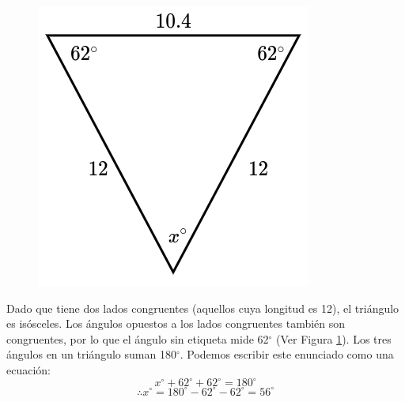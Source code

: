 \begin{minipage}[t][][t]{0.6\textwidth}
    \begin{solutionbox}{8cm}
        \begin{minipage}{0.3\textwidth}
            \begin{figure}[H]
                \centering
                \includegraphics[width=0.9\linewidth]{../images/findangle02a.png}
                \caption{}
                \label{fig:findangle02a}
            \end{figure}
        \end{minipage}\hfill
        \begin{minipage}{0.65\textwidth}
            Dado que tiene dos lados congruentes (aquellos cuya longitud es 12), el triángulo es isósceles. Los ángulos opuestos a los lados congruentes también son congruentes, por lo que el ángulo sin etiqueta mide 62$^\circ$ (Ver Figura \ref{fig:findangle02a}).
            Los tres ángulos en un triángulo suman 180$^\circ$. Podemos escribir este enunciado como una ecuación:
            \[x^\circ + 62^\circ + 62^\circ = 180^\circ \]
            \[\therefore x^\circ = 180^\circ - 62^\circ - 62^\circ = 56^\circ\]
        \end{minipage}
    \end{solutionbox}
\end{minipage}
